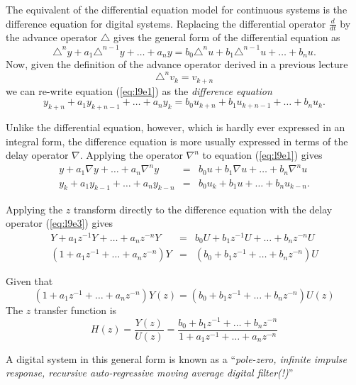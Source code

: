 \def\FileDate{98/11/18}
\def\FileVersion{1.0}

The equivalent of the differential equation model for continuous
systems is the difference equation for digital systems. Replacing
the differential operator $\frac{d}{dt}$ by the advance operator
$\triangle$ gives the general form of the differential equation as
\begin{equation}\label{eq:l9e1}
  \triangle^ny + a_{1}\triangle^{n-1}y + \ldots +  a_n y = b_0
  \triangle^n u + b_{1}\triangle^{n-1} u + \ldots + b_n u.
\end{equation}
Now, given the definition of the advance operator derived in a
previous lecture $$\triangle^n v_k = v_{k+n}$$ we can re-write
equation (\ref{eq:l9e1}) as the \emph{difference equation}
\begin{equation}\label{eq:l9e2}
  y_{k+n} + a_{1}y_{k+n-1} + \ldots + a_n y_k = b_0
   u_{k+n} + b_{1} u_{k+n-1} + \ldots +  b_n u_k.
\end{equation}

Unlike the differential equation, however, which is hardly ever
expressed in an integral form, the difference equation is more
usually expressed in terms of the delay operator $\nabla$.
Applying the operator $\nabla^n$ to equation (\ref{eq:l9e1}) gives
\begin{eqnarray}\label{eq:l9e3}
y + a_{1}\nabla y + \ldots  + a_n \nabla^n y &=& b_0 u +
b_{1}\nabla u + \ldots +  b_n\nabla^n u\\
  y_{k} + a_{1}y_{k-1} + \ldots +  a_n y_{k-n}
   &=& b_0
   u_{k} + b_{1} u + \ldots + b_n u_{k-n}.\label{eq:19e4}
   \end{eqnarray}

Applying the $z$ transform directly to the difference equation
with the delay operator (\ref{eq:l9e3}) gives
\begin{eqnarray}\label{l9e5}
 Y + a_{1}z^{-1} Y + \ldots + a_n z^{-n} Y
&=& b_0 U + b_{1}z^{-1} U + \ldots + b_n z^{-n} U\\ (1 +
a_{1}z^{-1} + \ldots +  a_n z^{-n}) Y &=& (b_0 + b_{1}z^{-1} +
\ldots + b_n z^{-n}) U \label{eq:19e6}
   \end{eqnarray}

\begin{slide}\label{slide:l9s1} 
Given that
\[(1 +
a_{1}z^{-1} + \ldots +  a_n z^{-n}) Y(z) = (b_0 + b_1 z^{-1} +
\ldots + b_n z^{-n}) U(z)\] The $z$ transfer function is
\[H(z) = \frac{Y(z)}{U(z)}=\frac{b_0 + b_{1}z^{-1} + \ldots + b_n
z^{-n}}{1 + a_1z^{-1} + \ldots + a_n z^{-n}}\]

A digital system in this general form is known as a
``\emph{pole-zero, infinite impulse response, recursive
auto-regressive moving average digital filter(!)}''
\end{slide}

